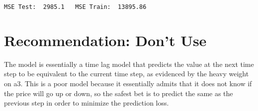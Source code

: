 \documentclass[11pt]{article}
\begin{document}
    \begin{Verbatim}[commandchars=\\\{\}]
MSE Test:  2985.1   MSE Train:  13895.86

    \end{Verbatim}

    \section{Recommendation: Don't Use}\label{recommendation-dont-use}

The model is essentially a time lag model that predicts the value at the
next time step to be equivalent to the current time step, as evidenced
by the heavy weight on a3. This is a poor model because it essentially
admits that it does not know if the price will go up or down, so the
safest bet is to predict the same as the previous step in order to
minimize the prediction loss.


    
    
    
    
\end{document}
